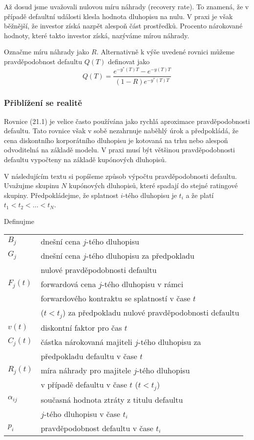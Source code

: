\documentclass[a4paper]{book}
\begin{document}
Až dosud jsme uvažovali nulovou míru náhrady (recovery rate). To znamená, že v případě defaultní události klesla hodnota dluhopisu na nulu. V praxi je však běžnější, že investor získá nazpět alespoň část prostředků. Procento nárokované hodnoty, které takto investor získá, nazýváme mírou náhrady.

Označme míru náhrady jako $R$. Alternativně k výše uvedené rovnici můžeme pravděpodobnost defaultu $Q(T)$ definovat jako
\begin{equation}
Q(T) = \frac{e^{-y^*(T)T} - e^{-y(T)T}}{(1-R)e^{-y^*(T)T}}
\end{equation}

\subsubsection{Přiblížení se realitě}

Rovnice (21.1) je velice často používána jako rychlá aproximace pravděpodobnosti defaultu. Tato rovnice však v sobě nezahrnuje naběhlý úrok a předpokládá, že cena diskontního korporátního dluhopisu je kotovaná na trhu nebo alespoň odvoditelná na základě modelu. V praxi musí být většinou pravděpodobnosti defaultu vypočteny na základě kupónových dluhopisů.

V následujícím textu si popíšeme způsob výpočtu pravděpodobnosti defaultu. Uvažujme skupinu $N$ kupónových dluhopisů, které spadají do stejné ratingové skupiny. Předpokládejme, že splatnost $i$-tého dluhopisu je $t_i$ a že platí $t_1 < t_2 < ... < t_N$.

Definujme
\begin{center}
\begin{tabular}{l l}
$B_j$     & dnešní cena $j$-tého dluhopisu\\
$G_j$     & dnešní cena $j$-tého dluhopisu za předpokladu\\
          & nulové pravděpodobnosti defaultu\\
$F_j(t)$  & forwardová cena $j$-tého dluhopisu v rámci\\
          & forwardového kontraktu se splatností v čase $t$\\
          & ($t < t_j$) za předpokladu nulové pravděpodobnosti defaultu\\
$v(t)$    & diskontní faktor pro čas $t$\\
$C_j(t)$  & částka nárokovaná majiteli $j$-tého dluhopisu za\\
          & předpokladu defaultu v čase $t$\\
$R_j(t)$  & míra náhrady pro majitele $j$-tého dluhopisu\\
          & v případě defaultu v čase $t$ ($t < t_j$)\\
$\alpha_{ij}$  & současná hodnota ztráty z titulu defaultu\\
          &$j$-tého dluhopisu v čase $t_i$\\
$p_i$     & pravděpodobnost defaultu v čase $t_i$\\
\end{tabular}
\end{center}
\end{document}

